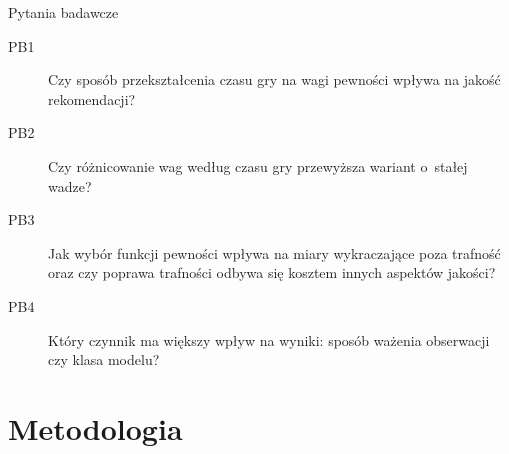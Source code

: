 \documentclass[aspectratio=169,11pt]{beamer}
\begin{document}
\begin{frame}{Pytania badawcze}

  \begin{description}
    \item[PB1] Czy sposób przekształcenia czasu gry na wagi pewności wpływa na jakość
               rekomendacji?
    \vspace{0.6em}
    \item[PB2] Czy różnicowanie wag według czasu gry przewyższa wariant o~stałej wadze?
    \vspace{0.6em}
    \item[PB3] Jak wybór funkcji pewności wpływa na miary wykraczające poza trafność oraz czy poprawa trafności odbywa się kosztem innych aspektów jakości?
    \vspace{0.6em}
    \item[PB4] Który czynnik ma większy wpływ na wyniki: sposób ważenia obserwacji czy klasa modelu?

  \end{description}

\end{frame}

\section{Metodologia}
\end{document}
